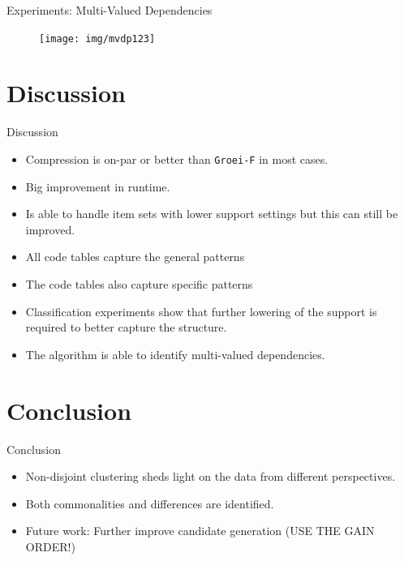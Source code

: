 \documentclass{beamer}
\begin{document}
\begin{frame}{Experiments: Multi-Valued Dependencies}
\begin{figure}[H]
  \centering
  \texttt{[image: img/mvdp123]}
\end{figure}
\end{frame}

\section{Discussion}

\begin{frame}{Discussion}
	\begin{itemize}
		\item Compression is on-par or better than \texttt{Groei-F} in most cases.
		\item Big improvement in runtime.
		\item Is able to handle item sets with lower support settings but this can still be improved.
		\item All code tables capture the general patterns
		\item The code tables also capture specific patterns
		\item Classification experiments show that further lowering of the support is required to better capture the structure.
		\item The algorithm is able to identify multi-valued dependencies.
	\end{itemize}
\end{frame}

\section{Conclusion}

\begin{frame}{Conclusion}
	\begin{itemize}
		\item Non-disjoint clustering sheds light on the data from different perspectives.
		\item Both commonalities and differences are identified.
		\item Future work: Further improve candidate generation (USE THE GAIN ORDER!)
	\end{itemize}
\end{frame}
\end{document}
